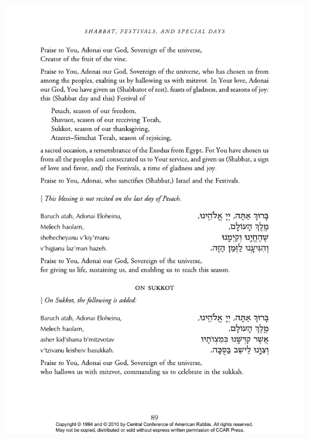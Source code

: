 \documentclass[12pt]{report}
\begin{document}
\includegraphics[scale=0.6]{figs/0A027-shehecheyanu}
\end{document}

